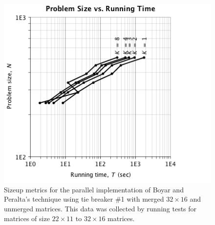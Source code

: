 \begin{figure}
\begin{center}
\includegraphics[scale=0.35]{./chapter_optimize/t1m_size_4.png}
\caption{Sizeup metrics for the parallel implementation of Boyar and Peralta's technique using tie breaker \#1 with merged $32 \times 16$ and unmerged matrices. This data was collected by running tests for matrices of size $22 \times 11$ to $32 \times 16$ matrices.}
\label{fig:sizeup2}
\end{center}
\end{figure}



